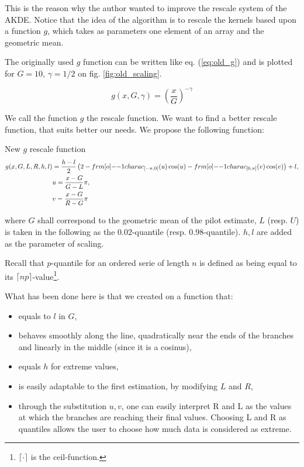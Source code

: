 \documentclass[11pt]{book}
\begin{document}
This is the reason why the author wanted to improve the rescale system of the AKDE. Notice that the idea of the algorithm is to rescale the kernels based upon a function $g$, which takes as parameters one element of an array and the geometric mean. 

The originally used $g$ function can be written like eq. (\ref{eq:old_g}) and is plotted for $G = 10$, $\gamma = 1/2$ on fig. \ref{fig:old_scaling}. 

\begin{equation}
\label{eq:old_g}
g(x,G, \gamma) =  \left ( \frac x G \right ) ^{-\gamma}
\end{equation}

We call the function $g$ the rescale function. We want to find a better rescale function, that suits better our needs. We propose the following function:


\begin{theoreme}[label = thrm:new_g]{New $g$ rescale function}
\begin{align}
\label{eq:new_g}
g(x, G, L,R,h,l) &=   \frac {h-l} 2 \left (2 
-  \11charac_{ [- \pi, 0]} (u)  \cos(u)
-  \11charac_{ [0, \pi]} (v)  \cos(v) \right ) + l,  \\
\quad & u = \frac{x - G}{G- L} \pi, \notag  \\
\quad & v = \frac{x - G}{R- G} \pi \notag
\end{align}

where $G$ shall correspond to the geometric mean of the pilot estimate, $L$ (resp. $U$) is taken in the following as the $0.02$-quantile (resp. $0.98$-quantile). $h,l$ are added as the parameter of scaling.
\end{theoreme}



Recall that $p$-quantile for an ordered serie of length $n$ is defined as being equal to its $\lceil{np}\rceil$-value\footnote{$\lceil{\cdot}\rceil$ is the ceil-function.}.


What has been done here is that we created on a function that:



\begin{itemize}
\item equals to $l$ in $G$, 
\item behaves smoothly along the line, quadratically near the ends of the branches and linearly in the middle (since it is a cosinus),
\item equals $h$ for extreme values,
\item is easily adaptable to the first estimation, by modifying $L$ and $R$,
\item through the substitution $u,v$, one can easily interpret R and L as the values at which the branches are reaching their final values. Choosing L and R as quantiles allows the user to choose how much data is considered as extreme. 
\end{itemize}
\end{document}
